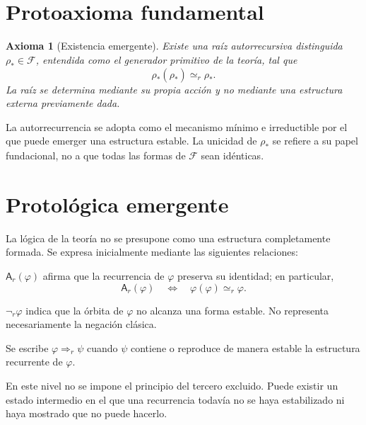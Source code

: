 \documentclass[11pt]{article}
\numberwithin{equation}{section}
\theoremstyle{prism}
\newtheorem{axioma}{Axioma}
\newcommand{\F}{\mathcal{F}}
\newcommand{\raiz}{\rho_{\!*}}
\newcommand{\peq}{\simeq_{\!r}}
\newcommand{\pentails}{\Rightarrow_{\!r}}
\newcommand{\pneg}{\neg_{\!r}}
\begin{document}
\section{Protoaxioma fundamental}

\setcounter{axioma}{-1}
\begin{axioma}[Existencia emergente]
Existe una raíz autorrecursiva distinguida $\raiz\in\F$, entendida como el
generador primitivo de la teoría, tal que
\begin{equation}
  \raiz(\raiz)\peq\raiz.
  \label{eq:raiz}
\end{equation}
La raíz se determina mediante su propia acción y no mediante una estructura
externa previamente dada.
\end{axioma}

La autorrecurrencia se adopta como el mecanismo mínimo e irreductible por el
que puede emerger una estructura estable. La unicidad de $\raiz$ se refiere a
su papel fundacional, no a que todas las formas de $\F$ sean idénticas.

\section{Protológica emergente}

La lógica de la teoría no se presupone como una estructura completamente
formada. Se expresa inicialmente mediante las siguientes relaciones:

\begin{description}[style=nextline,leftmargin=1.8em]
  \item[Afirmación autorrecursiva.]
  $\mathsf{A}_r(\varphi)$ afirma que la recurrencia de $\varphi$ preserva su
  identidad; en particular,
  \[
    \mathsf{A}_r(\varphi)
    \quad\Longleftrightarrow\quad
    \varphi(\varphi)\peq\varphi.
  \]

  \item[Negación protoformal.]
  $\pneg\varphi$ indica que la órbita de $\varphi$ no alcanza una forma estable.
  No representa necesariamente la negación clásica.

  \item[Implicación emergente.]
  Se escribe $\varphi\pentails\psi$ cuando $\psi$ contiene o reproduce de
  manera estable la estructura recurrente de $\varphi$.
\end{description}

En este nivel no se impone el principio del tercero excluido. Puede existir un
estado intermedio en el que una recurrencia todavía no se haya estabilizado ni
haya mostrado que no puede hacerlo.
\end{document}
